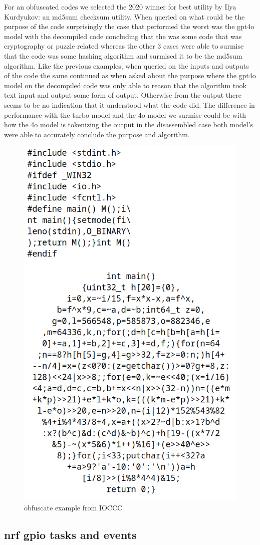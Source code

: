 For an obfuscated codes we selected the 2020 winner for best utility by Ilya
Kurdyukov: an md5sum checksum utility. \cite{iocccilya} When queried on what could be the purpose of the code surprisingly the case that performed the worst was the gpt4o model with the decompiled code concluding that the was some code that was cryptography or puzzle related whereas the other 3 cases were able to surmise that the code was some hashing algorithm and surmised it to be the md5sum algorithm. Like the previous examples, when queried on the inputs and outputs of the code the same continued as when asked about the purpose where the gpt4o model on the decompiled code was only able to reason that the algorithm took text input and output some form of output. Otherwise from the output there seems to be no indication that it understood what the code did. The difference in performance with the turbo model and the 4o model we surmise could be with how the 4o model is tokenizing the output in the disassembled case both model's were able to accurately conclude the purpose and algorithm.

\begin{figure}[!htb]
    \centering
    \includegraphics[width=0.5\linewidth]{2024-12-13-22-45-32-ioccc_org_2020_kurdyukov1_prog_c_qutebrowser.jpg}
    \caption{obfuscate example from IOCCC \cite{iocccilya}}
    \label{fig:enter-label}
\end{figure}

\subsection{nrf gpio tasks and events}

